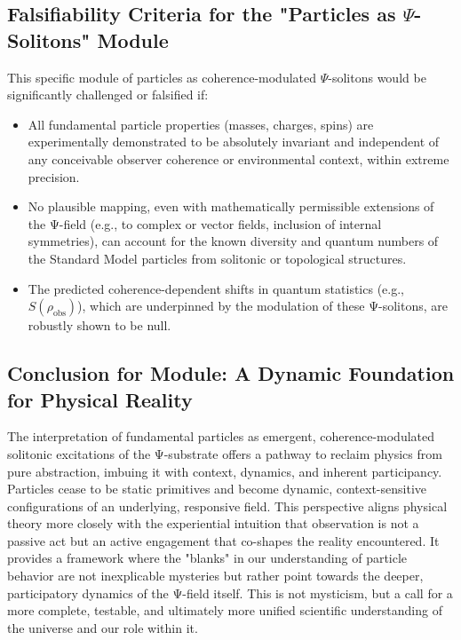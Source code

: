 \documentclass[11pt, a4paper]{book}
\begin{document}
\subsection{Falsifiability Criteria for the "Particles as $\Psi$-Solitons" Module}
\label{ssec:particles_falsifiability_mainpaper}
This specific module of particles as coherence-modulated $\Psi$-solitons would be significantly challenged or falsified if:
\begin{itemize}
    \item All fundamental particle properties (masses, charges, spins) are experimentally demonstrated to be absolutely invariant and independent of any conceivable observer coherence or environmental context, within extreme precision.
    \item No plausible mapping, even with mathematically permissible extensions of the Ψ-field (e.g., to complex or vector fields, inclusion of internal symmetries), can account for the known diversity and quantum numbers of the Standard Model particles from solitonic or topological structures.
    \item The predicted coherence-dependent shifts in quantum statistics (e.g., $S(\rho_{\text{obs}})$), which are underpinned by the modulation of these Ψ-solitons, are robustly shown to be null.
\end{itemize}

\subsection{Conclusion for Module: A Dynamic Foundation for Physical Reality}
\label{ssec:particles_conclusion_mainpaper}
The interpretation of fundamental particles as emergent, coherence-modulated solitonic excitations of the Ψ-substrate offers a pathway to reclaim physics from pure abstraction, imbuing it with context, dynamics, and inherent participancy. Particles cease to be static primitives and become dynamic, context-sensitive configurations of an underlying, responsive field. This perspective aligns physical theory more closely with the experiential intuition that observation is not a passive act but an active engagement that co-shapes the reality encountered. It provides a framework where the "blanks" in our understanding of particle behavior are not inexplicable mysteries but rather point towards the deeper, participatory dynamics of the Ψ-field itself. This is not mysticism, but a call for a more complete, testable, and ultimately more unified scientific understanding of the universe and our role within it.
\end{document}
